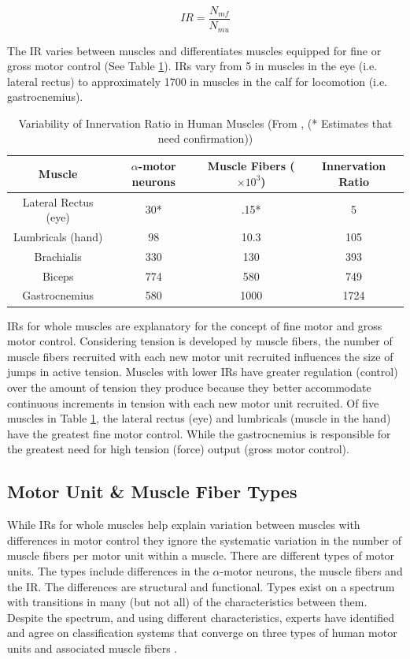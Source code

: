 \begin{equation}
    IR = \frac{N_{mf}}{N_{mu}}
\end{equation}

The IR varies between muscles and differentiates muscles equipped for fine or gross motor control (See Table \ref{table:Innervation_Ratios}). IRs vary from 5 in muscles in the eye (i.e. lateral rectus) to approximately 1700 in muscles in the calf for locomotion (i.e. gastrocnemius).

\begin{table}[h!]
\centering
\begin{tabular}{||c c c c||} 
 \hline
 Muscle & $\alpha$-motor neurons & Muscle Fibers ($\times 10^3$) & Innervation Ratio \\ [0.5ex] 
 \hline\hline
 Lateral Rectus (eye) & 30* &.15* & 5 \\
 Lumbricals (hand) &  98 & 10.3 & 105 \\ 
 Brachialis & 330 & 130 & 393 \\
 Biceps  & 774 & 580 & 749 \\ 
 Gastrocnemius & 580 & 1000 & 1724 \\[1ex] 
 \hline
\end{tabular}
\caption{Variability of Innervation Ratio in Human Muscles (\footnotesize{From \cite{buchthal_motor_1980}, (* Estimates that need confirmation)})}
\label{table:Innervation_Ratios}
\end{table}

IRs for whole muscles are explanatory for the concept of fine motor and gross motor control. Considering tension is developed by muscle fibers, the number of muscle fibers recruited with each new motor unit recruited influences the size of jumps in active tension. Muscles with lower IRs have greater regulation (control) over the amount of tension they produce because they better accommodate continuous increments in tension with each new motor unit recruited. Of five muscles in Table \ref{table:Innervation_Ratios}, the lateral rectus (eye) and lumbricals (muscle in the hand) have the greatest fine motor control. While the gastrocnemius is responsible for the greatest need for high tension (force) output (gross motor control).

\subsection{Motor Unit \& Muscle Fiber Types}

While IRs for whole muscles help explain variation between muscles with differences in motor control they ignore the systematic variation in the number of muscle fibers per motor unit within a muscle. There are different types of motor units. The types include differences in the $\alpha$-motor neurons, the muscle fibers and the IR. The differences are structural and functional. Types exist on a spectrum with transitions in many (but not all) of the characteristics between them. Despite the spectrum, and using different characteristics, experts have identified and agree on classification systems that converge on three types of human motor units and associated muscle fibers \cite{lieber_skeletal_2010}.

